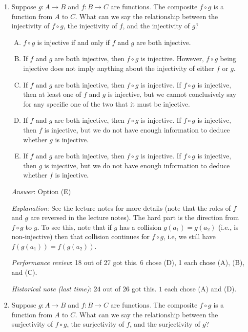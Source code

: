 \documentclass[10pt]{amsart}
\begin{document}
\begin{enumerate}
\item Suppose $g:A \to B$ and $f:B \to C$ are functions. The composite
  $f \circ g$ is a function from $A$ to $C$. What can we say the
  relationship between the injectivity of $f \circ g$, the injectivity
  of $f$, and the injectivity of $g$?

  \begin{enumerate}[(A)]
  \item $f \circ g$ is injective if and only if $f$ and $g$ are both injective.
  \item If $f$ and $g$ are both injective, then $f \circ g$ is
    injective. However, $f \circ g$ being injective does not imply
    anything about the injectivity of either $f$ or $g$.
  \item If $f$ and $g$ are both injective, then $f \circ g$ is
    injective. If $f \circ g$ is injective, then at least one of $f$
    and $g$ is injective, but we cannot conclusively say for any
    specific one of the two that it must be injective.
  \item If $f$ and $g$ are both injective, then $f \circ g$ is
    injective. If $f \circ g$ is injective, then $f$ is injective, but
    we do not have enough information to deduce whether $g$ is
    injective.
  \item If $f$ and $g$ are both injective, then $f \circ g$ is
    injective. If $f \circ g$ is injective, then $g$ is injective, but
    we do not have enough information to deduce whether $f$ is
    injective.
  \end{enumerate}

  {\em Answer}: Option (E)

  {\em Explanation}: See the lecture notes for more details (note that
  the roles of $f$ and $g$ are reversed in the lecture notes). The
  hard part is the direction from $f \circ g$ to $g$. To see this,
  note that if $g$ has a collision $g(a_1) = g(a_2)$ (i.e., is
  non-injective) then that collision continues for $f \circ g$, i.e,
  we still have $f(g(a_1)) = f(g(a_2))$.

  {\em Performance review}: 18 out of 27 got this. 6 chose (D), 1 each
  chose (A), (B), and (C).

  {\em Historical note (last time)}: $24$ out of $26$ got this. $1$ each chose
  (A) and (D).

\item Suppose $g:A \to B$ and $f:B \to C$ are functions. The composite
  $f \circ g$ is a function from $A$ to $C$. What can we say the
  relationship between the surjectivity of $f \circ g$, the surjectivity
  of $f$, and the surjectivity of $g$?


\end{enumerate}
\end{document}
